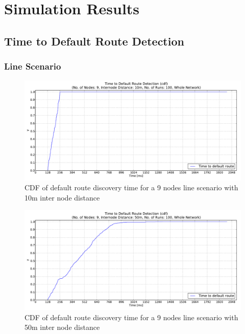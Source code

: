 \chapter{Simulation Results}

\section{Time to Default Route Detection}
\label{Appx:cdf}
\subsection{Line Scenario}
\label{Appx:cdf:line}
\begin{figure}[htbp]
  \begin{center}
    \leavevmode
      \includegraphics[width=\textwidth]
      {Pics/results/9/MRHOF/line/dist10_montecarlo_cdf_hist.pdf}
   \caption{CDF of default route discovery time for a 9 nodes line scenario with 10m inter node distance}
   \label{fig:9_MRHOF_line_10_cdf}
  \end{center}
\end{figure}

\begin{figure}[htbp]
  \begin{center}
    \leavevmode
        \includegraphics[width=\textwidth]
      {Pics/results/9/MRHOF/line/dist50_montecarlo_cdf_hist.pdf}
   \caption{CDF of default route discovery time for a 9 nodes line scenario with 50m inter node distance}
   \label{fig:9_MRHOF_line_50_cdf}
  \end{center}
\end{figure}

